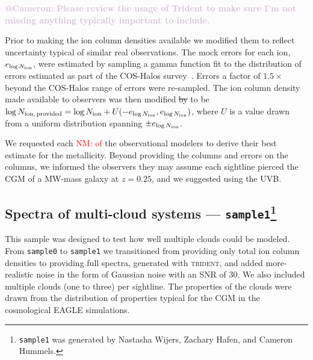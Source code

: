 \documentclass[fleqn,usenatbib]{mnras}
\makeatletter
\newcommand{\atcameron}[1]{\textcolor{Thistle}{\textbf{@Cameron: #1}}}
\newcommand{\nmr}[1]{\textcolor{red}{NM: #1}}
\makeatother
\begin{document}
\atcameron{Please review the usage of Trident to make sure I'm not missing anything typically important to include.}

Prior to making the ion column densities available we modified them to reflect uncertainty typical of similar real observations.
The mock errors for each ion, $e_{\log N_{\rm ion}}$, were estimated by sampling a gamma function fit to the distribution of errors estimated as part of the COS-Halos survey~\citep{Werk2013}.
Errors a factor of $1.5\times$ beyond the COS-Halos range of errors were re-sampled.
The ion column density made available to observers was then modified \sout{by} to be $\log N_{\rm ion,\,provided} = \log N_{\rm ion} + U(-e_{\log N_{\rm ion}}, e_{\log N_{\rm ion}} )$, where $U$ is a value drawn from a uniform distribution spanning $\pm e_{\log N_{\rm ion}}$.

We requested each \nmr{of} the observational modelers to derive their best estimate for the metallicity.
Beyond providing the columns and errors on the columns, we informed the observers they may assume each sightline pierced the CGM of a MW-mass galaxy at $z=0.25$, and we suggested using the \cite{Haardt2012} UVB.

\subsection[Spectra of multi-cloud systems --- \texttt{sample1}]{Spectra of multi-cloud systems --- \texttt{sample1}\footnote{
\texttt{sample1} was generated by Nastasha Wijers, Zachary Hafen, and Cameron Hummels.
}}
\label{s: data generation -- sample1}

This sample was designed to test how well multiple clouds could be modeled.
From \texttt{sample0} to \texttt{sample1} we transitioned from providing only total ion column densities to providing full spectra, generated with \textsc{trident}, and added more-realistic noise in the form of Gaussian noise with an SNR of 30.
We also included multiple clouds (one to three) per sightline.
The properties of the clouds were drawn from the distribution of properties typical for the CGM in the cosmological \textsc{EAGLE} simulations.
\end{document}
